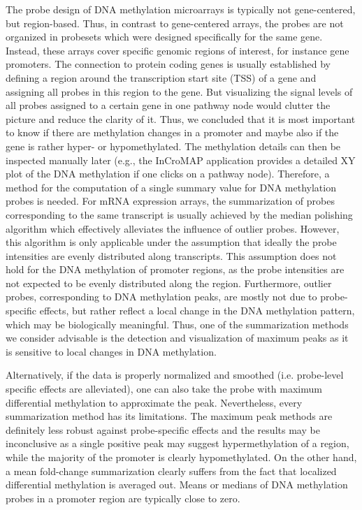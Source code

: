 \documentclass{bioinfo}
\begin{document}
The probe design of DNA methylation microarrays is typically not gene-centered, but
region-based. Thus, in contrast to gene-centered arrays, the probes are not organized in
probesets which were designed specifically for the same gene. Instead, these arrays
cover specific genomic regions of interest, for instance gene promoters. The connection to protein
coding genes is usually established by defining a region around the transcription start site (TSS)
of a gene and assigning all probes in this region to the gene.
%
But visualizing the signal levels of all probes assigned to a certain gene in one pathway node would
clutter the picture and reduce the clarity of it.
Thus, we concluded that it is most important to know if there are methylation changes in a promoter and maybe also if the gene
is rather hyper- or hypomethylated. The methylation details can then be inspected manually later
(e.g., the InCroMAP application provides a detailed XY plot of the DNA methylation if one clicks on a pathway node).
Therefore, a method for the computation of a single summary value for DNA methylation probes is needed. For mRNA expression arrays, the summarization of probes corresponding to
the same transcript is usually achieved by the median polishing algorithm \citep[see][]{GCRMA} which
effectively alleviates the influence of outlier probes. However, this algorithm is only applicable under the assumption
that ideally the probe intensities are evenly distributed along transcripts.
This assumption does not hold for the DNA methylation of promoter regions, as the probe intensities are
not expected to be evenly distributed along the region. Furthermore, outlier probes, corresponding to
DNA methylation peaks, are mostly not due to probe-specific effects, but rather reflect a local change
in the DNA methylation pattern, which may be biologically meaningful. Thus, one of the summarization methods we
consider advisable is the detection and visualization of maximum peaks as it is sensitive to local changes in DNA methylation.

Alternatively, if the data is properly normalized and smoothed (i.e. probe-level specific effects are alleviated), one can also take the probe with maximum differential methylation to approximate the peak.
Nevertheless, every summarization method has its limitations. The maximum peak methods are definitely
less robust against probe-specific effects and the results may be inconclusive as a single positive peak may
suggest hypermethylation of a region, while the majority of the promoter is clearly hypomethylated.
On the other hand, a mean fold-change summarization clearly suffers from the fact that localized differential methylation
is averaged out. Means or medians of DNA methylation probes in a promoter region are typically close to zero.
\end{document}
